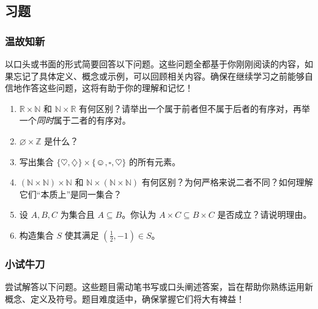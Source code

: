 \subsection{习题}

\subsubsection*{温故知新}

以口头或书面的形式简要回答以下问题。这些问题全都基于你刚刚阅读的内容，如果忘记了具体定义、概念或示例，可以回顾相关内容。确保在继续学习之前能够自信地作答这些问题，这将有助于你的理解和记忆！

\begin{enumerate}[label=(\arabic*)]
    \item $\mathbb{R} \times \mathbb{N}$ 和 $\mathbb{N} \times \mathbb{R}$ 有何区别？请举出一个属于前者但不属于后者的有序对，再举一个\emph{同时}属于二者的有序对。
    \item $\varnothing \times \mathbb{Z}$ 是什么？
    \item 写出集合 $\{\heartsuit, \diamondsuit\} \times \{\smiley{}, \square, \heartsuit\}$ 的所有元素。
    \item $(\mathbb{N} \times \mathbb{N}) \times \mathbb{N}$ 和 $\mathbb{N} \times (\mathbb{N} \times \mathbb{N})$ 有何区别？为何严格来说二者不同？如何理解它们``本质上''是同一集合？
    \item 设 $A,B,C$ 为集合且 $A \subseteq B$。你认为 $A \times C \subseteq B \times C$ 是否成立？请说明理由。
    \item 构造集合 $S$ 使其满足 $(\frac{1}{2}, -1) \in S$。
\end{enumerate}

\subsubsection*{小试牛刀}

尝试解答以下问题。这些题目需动笔书写或口头阐述答案，旨在帮助你熟练运用新概念、定义及符号。题目难度适中，确保掌握它们将大有裨益！

